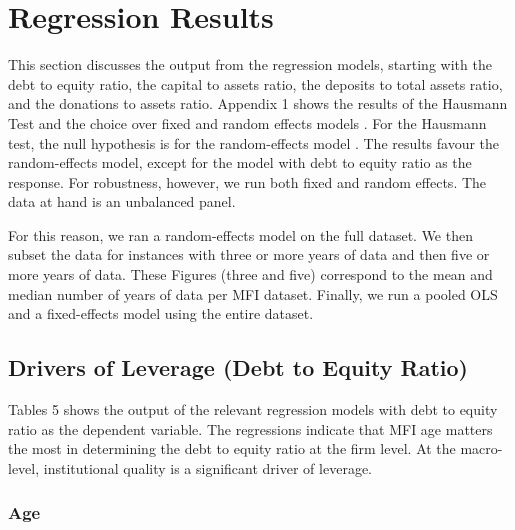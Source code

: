 \documentclass[a4paper, nobind]{templates/ociamthesis}
\begin{document}
\hypertarget{regression-results}{%
\section{Regression Results}\label{regression-results}}

This section discusses the output from the regression models, starting with the debt to equity ratio, the capital to assets ratio, the deposits to total assets ratio, and the donations to assets ratio. Appendix 1 shows the results of the Hausmann Test and the choice over fixed and random effects models \autocite{clark2015should}. For the Hausmann test, the null hypothesis is for the random-effects model \autocite{torres2007panel}. The results favour the random-effects model, except for the model with debt to equity ratio as the response. For robustness, however, we run both fixed and random effects. The data at hand is an unbalanced panel.

For this reason, we ran a random-effects model on the full dataset. We then subset the data for instances with three or more years of data and then five or more years of data. These Figures (three and five) correspond to the mean and median number of years of data per MFI dataset. Finally, we run a pooled OLS and a fixed-effects model using the entire dataset.

\hypertarget{drivers-of-leverage-debt-to-equity-ratio}{%
\subsection{Drivers of Leverage (Debt to Equity Ratio)}\label{drivers-of-leverage-debt-to-equity-ratio}}

Tables 5 shows the output of the relevant regression models with debt to equity ratio as the dependent variable. The regressions indicate that MFI age matters the most in determining the debt to equity ratio at the firm level. At the macro-level, institutional quality is a significant driver of leverage.

\hypertarget{age-2}{%
\subsubsection{Age}\label{age-2}}
\end{document}
